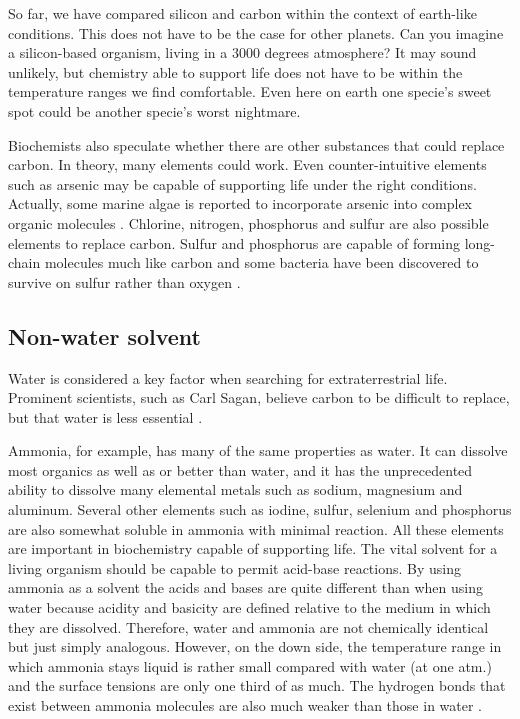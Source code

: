 So far, we have compared silicon and carbon within the context of earth-like conditions.
This does not have to be the case for other planets.
Can you imagine a silicon-based organism, living in a 3000 degrees atmosphere?
It may sound unlikely, but chemistry able to support life does not have to be within the temperature ranges we find comfortable.
Even here on earth one specie's sweet spot could be another specie's worst nightmare.

Biochemists also speculate whether there are other substances that could replace carbon.
In theory, many elements could work.
Even counter-intuitive elements such as arsenic may be capable of supporting life under the right conditions.
Actually, some marine algae is reported to incorporate arsenic into complex organic molecules \cite{OForm3}.
Chlorine, nitrogen, phosphorus and sulfur are also possible elements to replace carbon.
Sulfur and phosphorus are capable of forming long-chain molecules much like carbon and some bacteria have been discovered to survive on sulfur rather than oxygen \cite{OForm3}.

\subsection*{Non-water solvent}

Water is considered a key factor when searching for extraterrestrial life.
Prominent scientists, such as Carl Sagan, believe carbon to be difficult to replace, but that water is less essential \cite{OForm2} \cite{OForm3}.

Ammonia, for example, has many of the same properties as water.
It can dissolve most organics as well as or better than water, and it has the unprecedented ability to dissolve many elemental metals such as sodium, magnesium and aluminum.
Several other elements such as iodine, sulfur, selenium and phosphorus are also somewhat soluble in ammonia with minimal reaction.
All these elements are important in biochemistry capable of supporting life.
The vital solvent for a living organism should be capable to permit acid-base reactions.
By using ammonia as a solvent the acids and bases are quite different than when using water because acidity and basicity are defined relative to the medium in which they are dissolved. Therefore, water and ammonia are not chemically identical but just simply analogous.
However, on the down side, the temperature range in which ammonia stays liquid is rather small compared with water (at one atm.) and the surface tensions are only one third of as much.
The hydrogen bonds that exist between ammonia molecules are also much weaker than those in water \cite{OForm7}.

